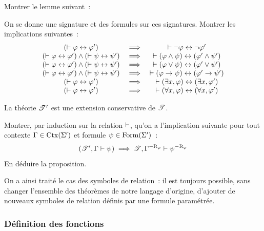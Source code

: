 \begin{exercise}
  Montrer le lemme suivant~:
  \begin{lemma}
    On se donne une signature et des formules sur ces signatures. Montrer les
    implications suivantes~:
    \[\begin{array}{ccc}
      (\vdash \varphi \mathrel{\leftrightarrow} \varphi') &\implies&
      \vdash \lnot \varphi \mathrel{\leftrightarrow} \lnot \varphi'\\
      (\vdash \varphi \mathrel{\leftrightarrow} \varphi') \land
      (\vdash \psi \mathrel{\leftrightarrow} \psi') &\implies&
      \vdash (\varphi \land \psi) \mathrel{\leftrightarrow} (\varphi' \land \psi') \\
      (\vdash \varphi \mathrel{\leftrightarrow} \varphi') \land
      (\vdash \psi \mathrel{\leftrightarrow} \psi') &\implies&
      \vdash (\varphi \lor \psi) \mathrel{\leftrightarrow} (\varphi' \lor \psi') \\
      (\vdash \varphi \mathrel{\leftrightarrow} \varphi') \land
      (\vdash \psi \mathrel{\leftrightarrow} \psi') &\implies&
      \vdash (\varphi \to \psi) \mathrel{\leftrightarrow} (\varphi' \to \psi') \\
      (\vdash \varphi \mathrel{\leftrightarrow} \varphi') &\implies&
      \vdash (\exists x, \varphi) \mathrel{\leftrightarrow} (\exists x, \varphi')\\
      (\vdash \varphi \mathrel{\leftrightarrow} \varphi') &\implies&
      \vdash (\forall x, \varphi) \mathrel{\leftrightarrow} (\forall x, \varphi')\\
    \end{array}\]
  \end{lemma}
\end{exercise}

\begin{proposition}
  La théorie $\mathscr T'$ est une extension conservative de $\mathscr T$.
\end{proposition}

\begin{exercise}
  Montrer, par induction sur la relation $\vdash$, qu'on a l'implication suivante
  pour tout contexte $\Gamma \in \operatorname{Ctx}(\Sigma')$ et formule
  $\psi \in \operatorname{Form}(\Sigma')$~:
  \[(\mathscr T', \Gamma \vdash \psi) \implies
  \mathscr T, {\Gamma}^{-\mathrm{R}_{\varphi}} \vdash {\psi}^{-\mathrm{R}_{\varphi}}\]
  En déduire la proposition.
\end{exercise}

On a ainsi traité le cas des symboles de relation~: il est toujours possible,
sans changer l'ensemble des théorèmes de notre langage d'origine, d'ajouter de
nouveaux symboles de relation définis par une formule paramétrée.

\subsubsection{Définition des fonctions}

